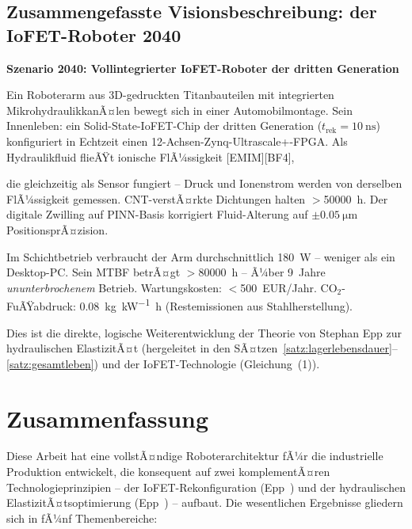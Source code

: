 ﻿\documentclass[a4paper,12pt]{scrreprt}
\theoremstyle{definition}
\begin{document}
\subsection{Zusammengefasste Visionsbeschreibung: der IoFET-Roboter 2040}

\begin{mdframed}[style=infoboxstyle]
\textbf{Szenario 2040: Vollintegrierter IoFET-Roboter der dritten Generation}

\medskip
Ein Roboterarm aus 3D-gedruckten Titanbauteilen mit integrierten
MikrohydraulikkanÃ¤len bewegt sich in einer Automobilmontage.
Sein Innenleben: ein Solid-State-IoFET-Chip der dritten Generation
($t_{\text{rek}} = \SI{10}{\nano\second}$) konfiguriert in Echtzeit
einen 12-Achsen-Zynq-Ultrascale+-FPGA.
Als Hydraulikfluid flieÃŸt ionische FlÃ¼ssigkeit [EMIM][BF4],\medskip

\noindent die gleichzeitig als Sensor fungiert -- Druck und
Ionenstrom werden von derselben FlÃ¼ssigkeit gemessen.
CNT-verstÃ¤rkte Dichtungen halten $>$\SI{50000}{\hour}.
Der digitale Zwilling auf PINN-Basis korrigiert Fluid-Alterung
auf $\pm\SI{0.05}{\micro\meter}$ PositionsprÃ¤zision.\medskip

\noindent Im Schichtbetrieb verbraucht der Arm durchschnittlich
\SI{180}{\watt} -- weniger als ein Desktop-PC.
Sein MTBF betrÃ¤gt $>$\SI{80000}{\hour} -- Ã¼ber 9~Jahre
\emph{ununterbrochenem} Betrieb.
Wartungskosten: $<$500~EUR/Jahr.
CO$_2$-FuÃŸabdruck: \SI{0.08}{\kilo\gram\per\kilo\watt\hour}
(Restemissionen aus Stahlherstellung).

\medskip
\noindent Dies ist die direkte, logische Weiterentwicklung der
Theorie von Stephan Epp zur hydraulischen ElastizitÃ¤t
(hergeleitet in den SÃ¤tzen~\ref{satz:lagerlebensdauer}--\ref{satz:gesamtleben})
und der IoFET-Technologie (Gleichung~(1)).
\end{mdframed}

\section{Zusammenfassung}

Diese Arbeit hat eine vollstÃ¤ndige Roboterarchitektur fÃ¼r die
industrielle Produktion entwickelt, die konsequent auf zwei
komplementÃ¤ren Technologieprinzipien -- der IoFET-Rekonfiguration
(Epp~\cite{iono2026}) und der hydraulischen ElastizitÃ¤tsoptimierung
(Epp~\cite{hydr2026}) -- aufbaut. Die wesentlichen Ergebnisse gliedern
sich in fÃ¼nf Themenbereiche:
\end{document}

